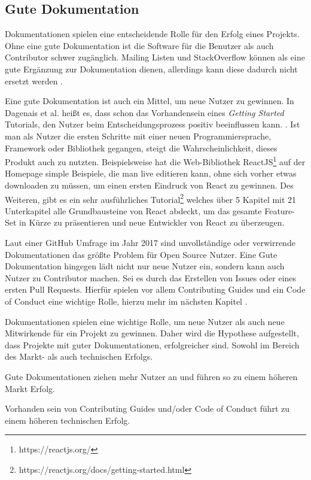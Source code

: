 \subsection{Gute Dokumentation}

Dokumentationen spielen eine entscheidende Rolle für den Erfolg eines Projekts.
Ohne eine gute Dokumentation ist die Software für die Benutzer als auch Contributor schwer zugänglich. 
Mailing Listen und StackOverflow können als eine gute Ergänzung zur Dokumentation dienen, allerdings kann
diese dadurch nicht ersetzt werden \cite{bangerthWhatMakesComputational2013}. %

Eine gute Dokumentation ist auch ein Mittel, um neue Nutzer zu gewinnen. In Dagenais et al. heißt es,
dass schon das Vorhandensein eines \textit{Getting Started} Tutorials, den Nutzer beim 
Entscheidungsprozess positiv beeinflussen kann. \cite{dagenaisDeveloperDocumentation}. %
Ist man als Nutzer die ersten Schritte mit einer neuen Programmiersprache, Framework oder Bibliothek
gegangen, steigt die Wahrscheinlichkeit, dieses Produkt auch zu nutzten.
Beispielsweise hat die Web-Bibliothek ReactJS\footnote{https://reactjs.org/} auf der Homepage simple 
Beispiele, die man live editieren kann, ohne sich vorher etwas downloaden zu müssen, um einen
ersten Eindruck von React zu gewinnen.
Des Weiteren, gibt es ein sehr ausführliches Tutorial\footnote{https://reactjs.org/docs/getting-started.html}
welches über 5 Kapitel mit 21 Unterkapitel alle Grundbausteine von React abdeckt, um das gesamte 
Feature-Set in Kürze zu präsentieren und neue Entwickler von React zu überzeugen.

Laut einer GitHub Umfrage im Jahr 2017 sind unvollständige oder verwirrende Dokumentationen das größte
Problem für Open Source Nutzer. Eine Gute Dokumentation hingegen lädt nicht nur neue Nutzer ein,
sondern kann auch Nutzer zu Contributor machen.
Sei es durch das Erstellen von Issues oder eines ersten Pull Requests.
Hierfür spielen vor allem Contributing Guides und ein Code of Conduct eine wichtige Rolle, hierzu
mehr im nächsten Kapitel \cite{GitHubOpenSourceSurvey2017}.

Dokumentationen spielen eine wichtige Rolle, um neue Nutzer als auch neue Mitwirkende für ein
Projekt zu gewinnen. 
Daher wird die Hypothese aufgestellt, dass Projekte mit guter Dokumentationen, erfolgreicher sind.
Sowohl im Bereich des Markt- als auch technischen Erfolgs.


\begin{hypothesis}
    Gute Dokumentationen ziehen mehr Nutzer an und führen so zu einem höheren Markt Erfolg.
\end{hypothesis}

\begin{hypothesis}
    Vorhanden sein von Contributing Guides und/oder Code of Conduct führt zu einem höheren technischen Erfolg.
\end{hypothesis}